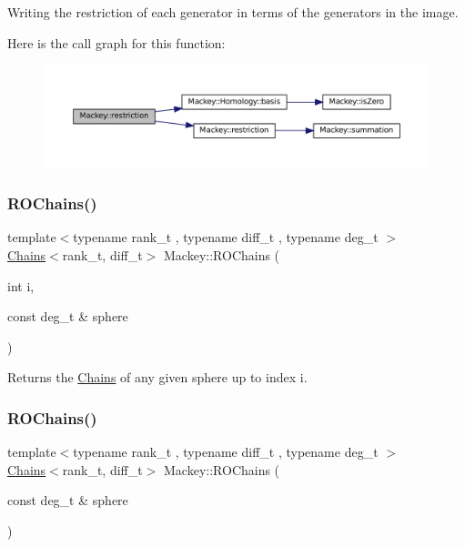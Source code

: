 Writing the restriction of each generator in terms of the generators in the image. 

Here is the call graph for this function\+:\nopagebreak
\begin{figure}[H]
\begin{center}
\leavevmode
\includegraphics[width=350pt]{namespaceMackey_a6818760aa9590810daace862e4c71f04_cgraph}
\end{center}
\end{figure}
\mbox{\label{namespaceMackey_a08fd3743ffb625fceca454da757dfa5d}} 
\subsubsection{\texorpdfstring{R\+O\+Chains()}{ROChains()}\hspace{0.1cm}{\footnotesize\ttfamily [1/2]}}
{\footnotesize\ttfamily template$<$typename rank\+\_\+t , typename diff\+\_\+t , typename deg\+\_\+t $>$ \\
\hyperlink{classMackey_1_1Chains}{Chains}$<$rank\+\_\+t, diff\+\_\+t$>$ Mackey\+::\+R\+O\+Chains (\begin{DoxyParamCaption}\item[{int}]{i,  }\item[{const deg\+\_\+t \&}]{sphere }\end{DoxyParamCaption})}



Returns the \hyperlink{classMackey_1_1Chains}{Chains} of any given sphere up to index i. 

\mbox{\label{namespaceMackey_abd3c2e12c91baa573c6dbaa37eeb0518}} 
\subsubsection{\texorpdfstring{R\+O\+Chains()}{ROChains()}\hspace{0.1cm}{\footnotesize\ttfamily [2/2]}}
{\footnotesize\ttfamily template$<$typename rank\+\_\+t , typename diff\+\_\+t , typename deg\+\_\+t $>$ \\
\hyperlink{classMackey_1_1Chains}{Chains}$<$rank\+\_\+t, diff\+\_\+t$>$ Mackey\+::\+R\+O\+Chains (\begin{DoxyParamCaption}\item[{const deg\+\_\+t \&}]{sphere }\end{DoxyParamCaption})}



